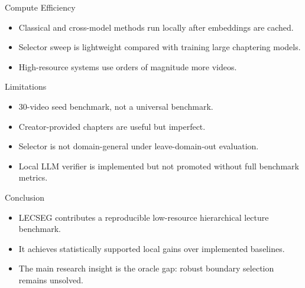 \documentclass[aspectratio=169]{beamer}
\begin{document}
\begin{frame}{Compute Efficiency}
  \begin{itemize}
    \item Classical and cross-model methods run locally after embeddings are cached.
    \item Selector sweep is lightweight compared with training large chaptering models.
    \item High-resource systems use orders of magnitude more videos.
  \end{itemize}
\end{frame}

\begin{frame}{Limitations}
  \begin{itemize}
    \item 30-video seed benchmark, not a universal benchmark.
    \item Creator-provided chapters are useful but imperfect.
    \item Selector is not domain-general under leave-domain-out evaluation.
    \item Local LLM verifier is implemented but not promoted without full benchmark metrics.
  \end{itemize}
\end{frame}

\begin{frame}{Conclusion}
  \begin{itemize}
    \item LECSEG contributes a reproducible low-resource hierarchical lecture benchmark.
    \item It achieves statistically supported local gains over implemented baselines.
    \item The main research insight is the oracle gap: robust boundary selection remains unsolved.
  \end{itemize}
\end{frame}
\end{document}
